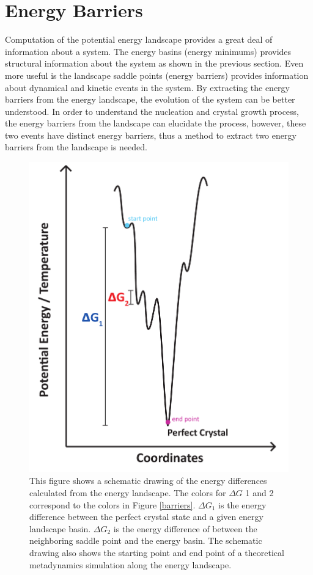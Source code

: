 \section{Energy Barriers}
Computation of the potential energy landscape provides a great deal of information about a system.  The energy basins (energy minimums) provides structural information about the system as shown in the previous section.  Even more useful is the landscape saddle points (energy barriers) provides information about dynamical and kinetic events in the system.  By extracting the energy barriers from the energy landscape, the evolution of the system can be better understood.  In order to understand the nucleation and crystal growth process, the energy barriers from the landscape can elucidate the process, however, these two events have distinct energy barriers, thus a method to extract two energy barriers from the landscape is needed.

\begin{figure}[h]
	\centering
	\includegraphics[width=.5\textwidth]{./Figures/Nucleation/nucleation_landscape.pdf}
	\caption{This figure shows a schematic drawing of the energy differences calculated from the energy landscape.  The colors for $\Delta G$ 1 and 2 correspond to the colors in Figure \ref{barriers}.  $\Delta G_1$ is the energy difference between the perfect crystal state and a given energy landscape basin.  $\Delta G_2$ is the energy difference of between the neighboring saddle point and the energy basin.  The schematic drawing also shows the starting point and end point of a theoretical metadynamics simulation along the energy landscape.}
	\label{barriers_origin}
\end{figure}

